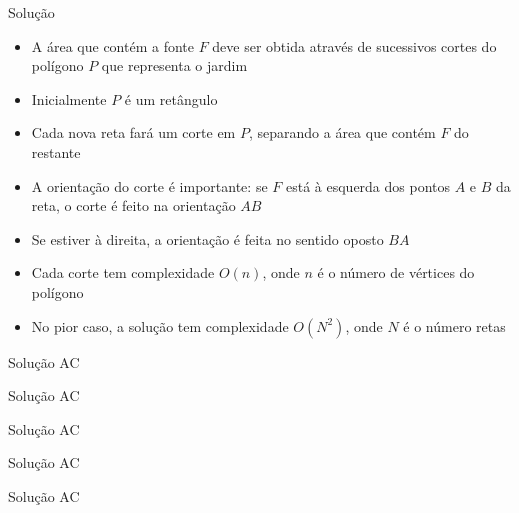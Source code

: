 \begin{frame}[fragile]{Solução}

    \begin{itemize}
        \item A área que contém a fonte $F$ deve ser obtida através de sucessivos cortes do
            polígono $P$ que representa o jardim
        \pause

        \item Inicialmente $P$ é um retângulo
        \pause

        \item Cada nova reta fará um corte em $P$, separando a área que contém $F$ do restante
        \pause

        \item A orientação do corte é importante: se $F$ está à esquerda dos pontos $A$ e $B$ da
            reta, o corte é feito na orientação $AB$
        \pause

        \item Se estiver à direita, a orientação é feita no sentido oposto $BA$ 
        \pause

        \item Cada corte tem complexidade $O(n)$, onde $n$ é o número de vértices do polígono
        \pause

        \item No pior caso, a solução tem complexidade $O(N^2)$, onde $N$ é o número retas
    \end{itemize}

\end{frame}

\begin{frame}[fragile]{Solução AC}
\end{frame}

\begin{frame}[fragile]{Solução AC}
\end{frame}

\begin{frame}[fragile]{Solução AC}
\end{frame}

\begin{frame}[fragile]{Solução AC}
\end{frame}

\begin{frame}[fragile]{Solução AC}
\end{frame}
